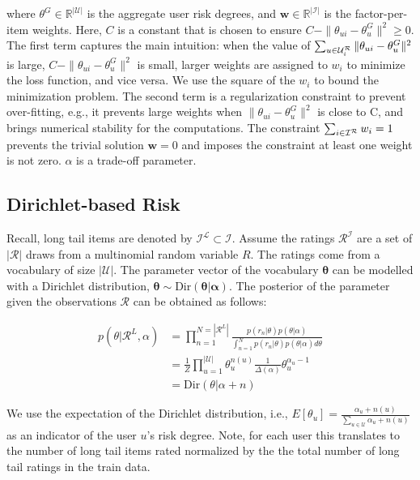 where  $\theta^G \in \mathbb{R}^{|\mathcal{U}|}$ is the aggregate user risk degrees,  and  $\mathbf{w} \in \mathbb{R}^{|\mathcal{I}|}$  is the factor-per-item weights. Here, $C$ is a constant that is chosen to ensure  $ C - \|\theta_{ui} -\theta_u^G\|^2 \geq 0$.  %
The first term captures the main intuition: when the value of $\sum_{u \in \mathcal{U}_{i}^{\mathcal{R}}} \|\theta_{ui} -\theta_u^G\|^2$  is large, $ C - \|\theta_{ui} -\theta_u^G\|^2$ is small,   larger weights are assigned to $w_i$ to minimize the loss function, and vice versa.   
We use the square of the $w_i$ to  bound the minimization problem. %
The second term is a regularization constraint to prevent over-fitting, e.g., it prevents large weights when $\|\theta_{ui} -\theta_u^G\|^2$ is close to C, and brings numerical stability for the computations. 
The constraint $\sum_{i \in \mathcal{I}^{\mathcal{R}} } w_i=1$  prevents the trivial solution $\mathbf{w}=0$ and imposes the constraint at least one weight is not zero. $\alpha$ is a trade-off parameter.  
\fi
\iffalse
\subsection{Dirichlet-based Risk} 
Recall, long tail items are denoted by $\mathcal{I}^{\mathcal{L}} \subset \mathcal{I}$. Assume the ratings $\mathcal{R}^{\mathcal{I}}$ are a set of $|\mathcal{R}|$ draws from a multinomial random variable  $R$. The ratings come from a vocabulary of size $|\mathcal{U}|$. The parameter vector of the vocabulary $\pmb{\theta}$ can be modelled with a Dirichlet distribution, $\pmb{\theta} \sim \text{Dir} (\pmb{ \theta|\alpha})$. The posterior of the parameter given the observations $\mathcal{R}$ can be obtained as follows:

\begin{align*}
p(\theta| \mathcal{R}^L, \alpha) &= \prod_{n=1}^{N=|\mathcal{R}^L|} \frac{p(r_n|\theta) p(\theta|\alpha)}{\int_{n=1}^{N} p(r_n|\theta) p(\theta|\alpha) d\theta } \\
&=\frac{1}{Z} \prod_{u=1}^{|\mathcal{U}|}  \theta_u^{n(u)} \frac{1}{\Delta(\alpha)} \theta_u^{\alpha_u-1}\\
&=\text{Dir}(\theta|\alpha + n)
\end{align*}

We use  the  expectation of the Dirichlet distribution, i.e., $E[\theta_u] = \frac{\alpha_u + n(u)}{\sum_{u \in \mathcal{U}} \alpha_u + n(u)}$ as an indicator of the user $u$'s risk degree. Note, for each user this translates to the number of long tail items  rated normalized by the the total number of long tail ratings in the train data.

